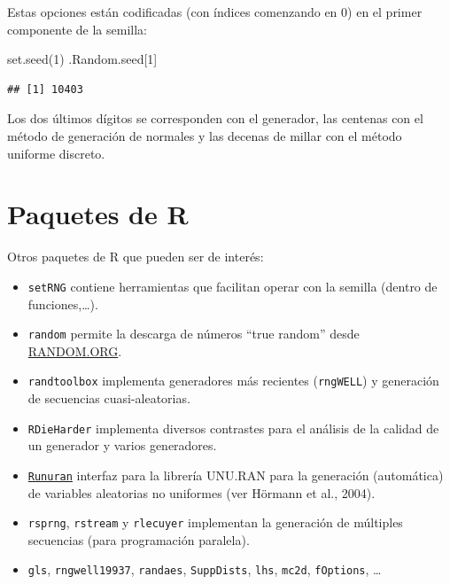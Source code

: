 \documentclass[
]{book}
\newenvironment{Shaded}{\begin{snugshade}}{\end{snugshade}}
\newcommand{\DecValTok}[1]{\textcolor[rgb]{0.00,0.00,0.81}{#1}}
\newcommand{\FunctionTok}[1]{\textcolor[rgb]{0.00,0.00,0.00}{#1}}
\newcommand{\NormalTok}[1]{#1}
\theoremstyle{break}
\theoremstyle{definition}
\theoremstyle{definition}
\theoremstyle{definition}
\theoremstyle{definition}
\theoremstyle{remark}
\begin{document}
Estas opciones están codificadas (con índices comenzando en 0) en el primer componente de la semilla:

\begin{Shaded}
\begin{Highlighting}[]
\FunctionTok{set.seed}\NormalTok{(}\DecValTok{1}\NormalTok{)}
\NormalTok{.Random.seed[}\DecValTok{1}\NormalTok{]}
\end{Highlighting}
\end{Shaded}

\begin{verbatim}
## [1] 10403
\end{verbatim}

Los dos últimos dígitos se corresponden con el generador, las centenas con el método de generación de normales y las decenas de millar con el método uniforme discreto.

\hypertarget{paquetes-de-r}{%
\section{Paquetes de R}\label{paquetes-de-r}}

Otros paquetes de R que pueden ser de interés:

\begin{itemize}
\item
  \texttt{setRNG} contiene herramientas que facilitan operar con la semilla
  (dentro de funciones,\ldots).
\item
  \texttt{random} permite la descarga de números ``true random'' desde \href{https://www.random.org}{RANDOM.ORG}.
\item
  \texttt{randtoolbox} implementa generadores más recientes (\texttt{rngWELL}) y
  generación de secuencias cuasi-aleatorias.
\item
  \texttt{RDieHarder} implementa diversos contrastes para el análisis de la
  calidad de un generador y varios generadores.
\item
  \href{http://statmath.wu.ac.at/unuran}{\texttt{Runuran}} interfaz para la librería UNU.RAN para la
  generación (automática) de variables aleatorias no uniformes (ver Hörmann et al., 2004).
\item
  \texttt{rsprng}, \texttt{rstream} y \texttt{rlecuyer} implementan la generación de múltiples
  secuencias (para programación paralela).
\item
  \texttt{gls}, \texttt{rngwell19937}, \texttt{randaes}, \texttt{SuppDists}, \texttt{lhs}, \texttt{mc2d},
  \texttt{fOptions}, \ldots{}
\end{itemize}
\end{document}
